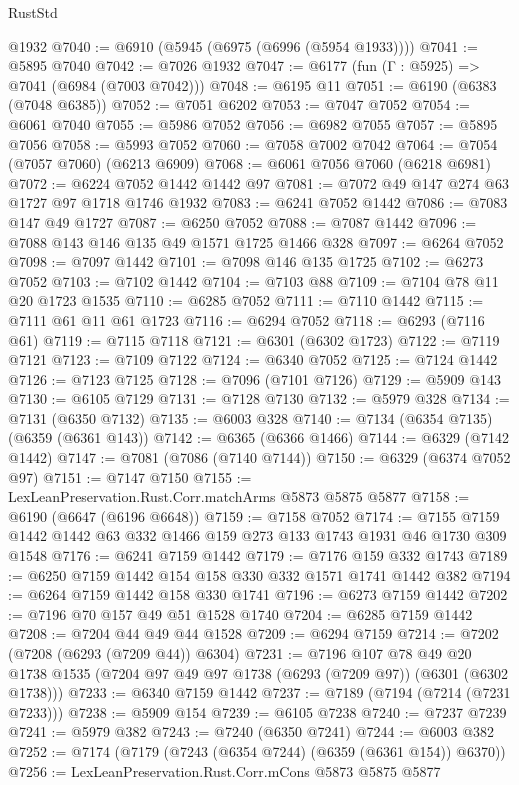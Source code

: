 \begin{lexlean}{RustStd}
\begin{coremodule}
{\begin{coremodule}
{{{{{{{{{{{{{{{{{{{{{{{{{{{{{{{{{{{    @1932
@7040 := @6910 (@5945 (@6975 (@6996 (@5954 @1933))))
@7041 := @5895 @7040
@7042 := @7026 @1932
@7047 := @6177 (fun (Γ : @5925) => @7041 (@6984 (@7003 @7042)))
@7048 := @6195 @11
@7051 := @6190 (@6383 (@7048 @6385))
@7052 := @7051 @6202
@7053 := @7047 @7052
@7054 := @6061 @7040
@7055 := @5986 @7052
@7056 := @6982 @7055
@7057 := @5895 @7056
@7058 := @5993 @7052
@7060 := @7058 @7002 @7042
@7064 := @7054 (@7057 @7060) (@6213 @6909)
@7068 := @6061 @7056 @7060 (@6218 @6981)
@7072 := @6224 @7052 @1442 @1442 @97
@7081 := @7072 @49 @147 @274 @63 @1727 @97 @1718 @1746 @1932
@7083 := @6241 @7052 @1442
@7086 := @7083 @147 @49 @1727
@7087 := @6250 @7052
@7088 := @7087 @1442
@7096 := @7088 @143 @146 @135 @49 @1571 @1725 @1466 @328
@7097 := @6264 @7052
@7098 := @7097 @1442
@7101 := @7098 @146 @135 @1725
@7102 := @6273 @7052
@7103 := @7102 @1442
@7104 := @7103 @88
@7109 := @7104 @78 @11 @20 @1723 @1535
@7110 := @6285 @7052
@7111 := @7110 @1442
@7115 := @7111 @61 @11 @61 @1723
@7116 := @6294 @7052
@7118 := @6293 (@7116 @61)
@7119 := @7115 @7118
@7121 := @6301 (@6302 @1723)
@7122 := @7119 @7121
@7123 := @7109 @7122
@7124 := @6340 @7052
@7125 := @7124 @1442
@7126 := @7123 @7125
@7128 := @7096 (@7101 @7126)
@7129 := @5909 @143
@7130 := @6105 @7129
@7131 := @7128 @7130
@7132 := @5979 @328
@7134 := @7131 (@6350 @7132)
@7135 := @6003 @328
@7140 := @7134 (@6354 @7135) (@6359 (@6361 @143))
@7142 := @6365 (@6366 @1466)
@7144 := @6329 (@7142 @1442)
@7147 := @7081 (@7086 (@7140 @7144))
@7150 := @6329 (@6374 @7052 @97)
@7151 := @7147 @7150
@7155 := LexLeanPreservation.Rust.Corr.matchArms @5873 @5875 @5877
@7158 := @6190 (@6647 (@6196 @6648))
@7159 := @7158 @7052
@7174 := @7155 @7159 @1442 @1442 @63 @332 @1466 @159 @273 @133 @1743 @1931 @46 @1730 @309 @1548
@7176 := @6241 @7159 @1442
@7179 := @7176 @159 @332 @1743
@7189 := @6250 @7159 @1442 @154 @158 @330 @332 @1571 @1741 @1442 @382
@7194 := @6264 @7159 @1442 @158 @330 @1741
@7196 := @6273 @7159 @1442
@7202 := @7196 @70 @157 @49 @51 @1528 @1740
@7204 := @6285 @7159 @1442
@7208 := @7204 @44 @49 @44 @1528
@7209 := @6294 @7159
@7214 := @7202 (@7208 (@6293 (@7209 @44)) @6304)
@7231 := @7196
    @107
    @78
    @49
    @20
    @1738
    @1535
    (@7204 @97 @49 @97 @1738 (@6293 (@7209 @97)) (@6301 (@6302 @1738)))
@7233 := @6340 @7159 @1442
@7237 := @7189 (@7194 (@7214 (@7231 @7233)))
@7238 := @5909 @154
@7239 := @6105 @7238
@7240 := @7237 @7239
@7241 := @5979 @382
@7243 := @7240 (@6350 @7241)
@7244 := @6003 @382
@7252 := @7174 (@7179 (@7243 (@6354 @7244) (@6359 (@6361 @154)) @6370))
@7256 := LexLeanPreservation.Rust.Corr.mCons @5873 @5875 @5877
}}}}}}}}}}}}}}}}}}}}}}}}}}}}}}}}}}}
\end{coremodule}}
\end{coremodule}
\end{lexlean}
